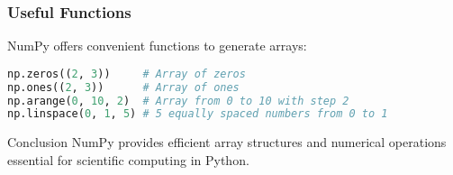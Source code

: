 \begin{frame}[fragile]
\frametitle{Useful Functions}
NumPy offers convenient functions to generate arrays:

\begin{lstlisting}[language=Python]
np.zeros((2, 3))     # Array of zeros
np.ones((2, 3))      # Array of ones
np.arange(0, 10, 2)  # Array from 0 to 10 with step 2
np.linspace(0, 1, 5) # 5 equally spaced numbers from 0 to 1
\end{lstlisting}
\end{frame}

\begin{frame}{Conclusion}
NumPy provides efficient array structures and numerical operations essential for scientific computing in Python.
\end{frame}

